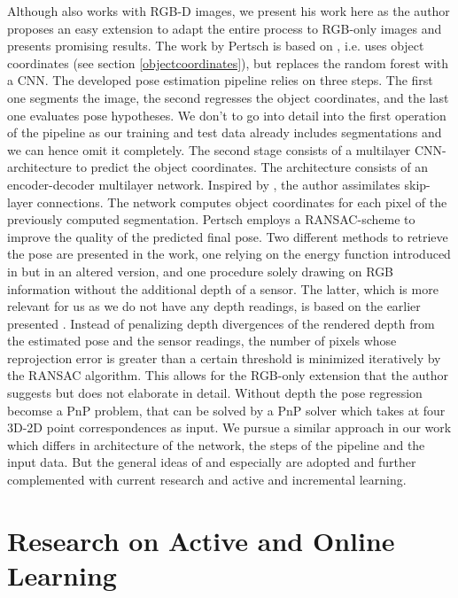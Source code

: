 Although \cite{pertsch} also works with RGB-D images, we present his work here as the author proposes an easy extension to adapt the entire process to RGB-only images and presents promising results. The work by Pertsch is based on \cite{brachmann1}, i.e. uses object coordinates  (see section \ref{objectcoordinates}), but replaces the random forest with a CNN. The developed pose estimation pipeline relies on three steps. The first one segments the image, the second regresses the object coordinates, and the last one evaluates pose hypotheses. 
\nnewline
We don't to go into detail into the first operation of the pipeline as our training and test data already includes segmentations and we can hence omit it completely. The second stage consists of a multilayer CNN-architecture to predict the object coordinates. The architecture consists of an encoder-decoder multilayer network. Inspired by \cite{oronneberger}, the author assimilates skip-layer connections. The network computes object coordinates for each pixel of the previously computed segmentation. Pertsch employs a RANSAC-scheme to improve the quality of the predicted final pose. Two different methods to retrieve the pose are presented in the work, one relying on the energy function introduced in \cite{brachmann1} but in an altered version, and one procedure solely drawing on RGB information without the additional depth of a sensor. The latter, which is more relevant for us as we do not have any depth readings, is based on the earlier presented \cite{brachmann2}. 
\nnewline
Instead of penalizing depth divergences of the rendered depth from the estimated pose and the sensor readings, the number of pixels whose reprojection error is greater than a certain threshold is minimized iteratively by the RANSAC algorithm. This allows for the RGB-only extension that the author suggests but does not elaborate in detail. Without depth the pose regression becomse a PnP problem, that can be solved by a PnP solver which takes at  four 3D-2D point correspondences as input. We pursue a similar approach in our work which differs in architecture of the network, the steps of the pipeline and the input data. But the general ideas of \cite{pertsch} and especially \cite{brachmann1} are adopted and further complemented with current research and active and incremental learning.

\section{Research on Active and Online Learning}

